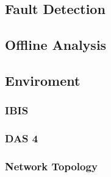   
 
\subsection{Fault Detection}
\subsection{Offline Analysis}

\subsection{Enviroment}
\subsubsection{IBIS}
\subsubsection{DAS 4}
\subsubsection{Network Topology}
